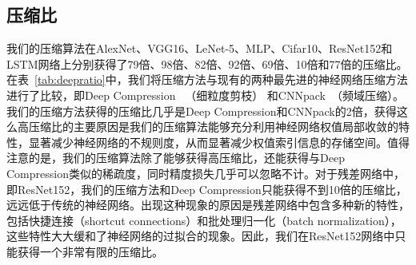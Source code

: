 \subsection{压缩比}
我们的压缩算法在AlexNet、VGG16、LeNet-5、MLP、Cifar10、ResNet152和LSTM网络上分别获得了79倍、98倍、82倍、92倍、69倍、10倍和77倍的压缩比。在表~\ref{tab:deepratio}中，我们将压缩方法与现有的两种最先进的神经网络压缩方法进行了比较，即Deep Compression~\cite{han2015deep} （细粒度剪枝） 和CNNpack~\cite{wang2016cnnpack}（频域压缩）。我们的压缩方法获得的压缩比几乎是Deep Compression和CNNpack的2倍，获得这么高压缩比的主要原因是我们的压缩算法能够充分利用神经网络权值局部收敛的特性，显著减少神经网络的不规则度，从而显著减少权值索引信息的存储空间。值得注意的是，我们的压缩算法除了能够获得高压缩比，还能获得与Deep Compression类似的稀疏度，同时精度损失几乎可以忽略不计。对于残差网络中，即ResNet152，我们的压缩方法和Deep Compression只能获得不到10倍的压缩比，远远低于传统的神经网络。出现这种现象的原因是残差网络中包含多种新的特性，包括快捷连接（shortcut connections）和批处理归一化（batch normalization），这些特性大大缓和了神经网络的过拟合的现象。因此，我们在ResNet152网络中只能获得一个非常有限的压缩比。

